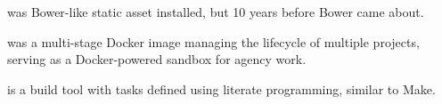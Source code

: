 \startitemize

  \item \from[pupu] was Bower-like static asset installed, but 10 years before Bower came about.

  \item \from[dpm] was a multi-stage Docker image managing the lifecycle of multiple projects, serving as a Docker-powered sandbox for agency work.
  \item \from[et]\high{\color[red]{WIP}} is a build tool with tasks defined using literate programming, similar to Make.
\stopitemize
